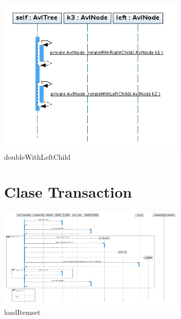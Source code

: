 \begin{figure}
\centering
\includegraphics[width=0.8\textwidth]{AvlTree/doubleWithLeftChild.png}
\caption{doubleWithLeftChild}
\end{figure}
\newpage


\begin{figure}
\section{Clase Transaction}
\centering
\includegraphics[angle=90, width=0.8\textwidth]{Transaction/loadItemsets2.png}
\caption{loadItemset}
\end{figure}
\newpage

